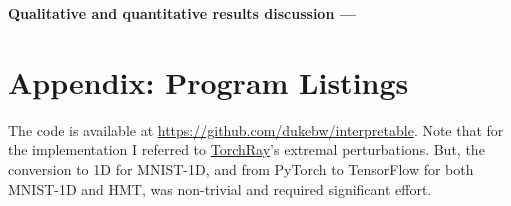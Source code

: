 \documentclass{article}
\newcommand{\myparagraph}[1]{\noindent\textbf{#1 ---}}
\begin{document}
\myparagraph{Qualitative and quantitative results discussion}


\clearpage
\appendix
\section{Appendix: Program Listings}

The code is available at \url{https://github.com/dukebw/interpretable}.
Note that for the implementation I referred to \hyperlink{https://github.com/facebookresearch/TorchRay}{TorchRay}'s extremal perturbations.
But, the conversion to 1D for MNIST-1D, and from PyTorch to TensorFlow for both MNIST-1D and HMT, was non-trivial and required significant effort.

\small


\end{document}
